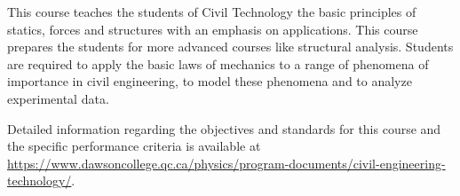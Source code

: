 {This course teaches the students of Civil Technology the basic principles of statics, forces and structures with an emphasis on applications.  This course prepares the students for more advanced courses like structural analysis.  Students are required to apply the basic laws of mechanics to a range of phenomena of importance in civil engineering, to model these phenomena and to analyze experimental data.
\smallskip

Detailed information regarding the objectives and standards for this course and the specific performance criteria is available at \url{https://www.dawsoncollege.qc.ca/physics/program-documents/civil-engineering-technology/}.}

